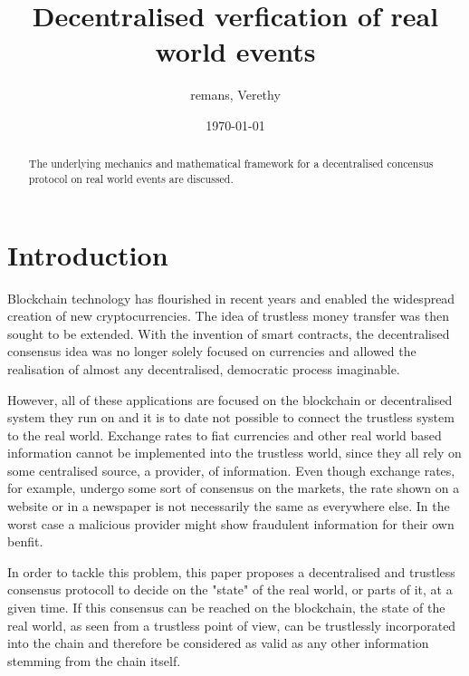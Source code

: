 \documentclass{article}
\title{Decentralised verfication of real world events}
\date{\today}
\author{remans, Verethy}
\begin{document}
	\maketitle
	
	\begin{abstract}
		The underlying mechanics and mathematical framework for a decentralised concensus protocol on real world events are discussed.
	\end{abstract}
	
	\section{Introduction}
		Blockchain technology has flourished in recent years and enabled the widespread creation of new cryptocurrencies. The idea of trustless money transfer was then sought to be extended. With the invention of smart contracts, the decentralised consensus idea was no longer solely focused on currencies and allowed the realisation of almost any decentralised, democratic process imaginable. 
		
		However, all of these applications are focused on the blockchain or decentralised system they run on and it is to date not possible to connect the trustless system to the real world. Exchange rates to fiat currencies and other real world based information cannot be implemented into the trustless world, since they all rely on some centralised source, a provider, of information. Even though exchange rates, for example, undergo some sort of consensus on the markets, the rate shown on a website or in a newspaper is not necessarily the same as everywhere else. In the worst case a malicious provider might show fraudulent information for their own benfit.
		
		In order to tackle this problem, this paper proposes a decentralised and trustless consensus protocoll to decide on the "state" of the real world, or parts of it, at a given time. If this consensus can be reached on the blockchain, the state of the real world, as seen from a trustless point of view, can be trustlessly incorporated into the chain and therefore be considered as valid as any other information stemming from the chain itself.
		
	 
\end{document}
